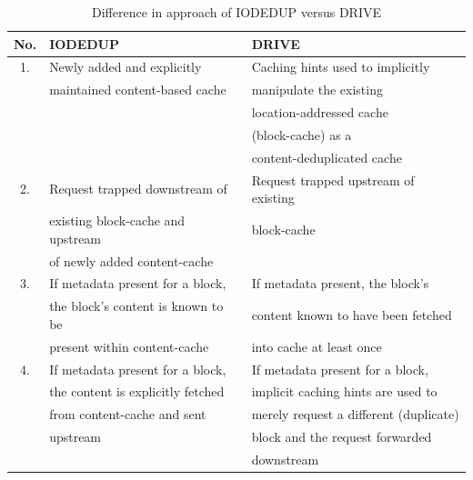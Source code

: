 \begin{table}[h]
\caption{Difference in approach of IODEDUP versus DRIVE}
\label{tab:drive-novelty}
\centering
\begin{tabular}{|c|l|l|} \hline
\textbf{No.} & \textbf{IODEDUP} & \textbf{DRIVE} \\ \hline
1. & Newly added and explicitly        & Caching hints used to implicitly \\
   & maintained content-based cache    & manipulate the existing          \\
   &                                   & location-addressed cache         \\ 
   &                                   & (block-cache) as a \\
   &                                   & content-deduplicated cache \\ \hline
2. & Request trapped downstream of     & Request trapped upstream of existing\\ 
   & existing block-cache and upstream & block-cache \\
   & of newly added content-cache      & \\ \hline
3. & If metadata present for a block,  & If metadata present, the block’s \\
   & the block’s content is known to be& content known to have been fetched \\
   & present within content-cache      & into cache at least once \\ \hline
4. & If metadata present for a block,  & If metadata present for a block, \\
   & the content is explicitly fetched & implicit caching hints are used to \\
   & from content-cache and sent   & merely request a different (duplicate) \\
   & upstream                          & block and the request forwarded \\
   &                                   & downstream \\ \hline
\end{tabular}
\end{table}


